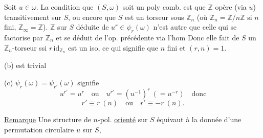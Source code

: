  Soit $u\in\omega$. La condition que $(S,\omega)$ soit un poly comb. est que $\mathbb Z$ opère (via $u$) transitivement sur $S$,  ou encore que $S$ est un torseur sous $\mathbb Z_n$ (où $\mathbb Z_n=\mathbb Z/n\mathbb Z$ si $n$ fini, $\mathbb Z_\infty=\mathbb Z$).   $\mathbb Z$ sur $S$ déduite de $u^r\in\psi_r(\omega)$ n'est autre que celle qui se factorise par $\mathbb Z_n$ et se déduit de l'op. précédente via l'hom
Donc elle fait de $S$ un $\mathbb Z_n$-torseur ssi $r\,\mathrm{id}_{\mathbb Z_n}$ est un iso, ce qui signifie que $n$ fini et $(r,n)=1$.

(b) est trivial  

 (c) $\psi_r(\omega)=\psi_{r'}(\omega)$ signifie
\[
u^{r'}=u^r\quad\text{ou}\quad u^{r'}=(u^{-1})^r\ (=u^{-r})\quad\text{donc}
\]
\[
r'\equiv r\ (n)\quad\text{ou}\quad r'\equiv-r\ (n).
\]

\uline{Remarque} Une structure de $n$-pol. \uline{orienté} sur $S$ équivaut à la donnée d'une permutation circulaire $u$ sur $S$,
